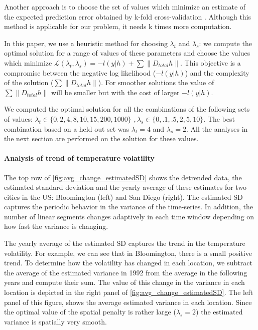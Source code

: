 \documentclass{article}
\begin{document}
Another approach is to choose the set of values which minimize an
estimate of the expected prediction error obtained by k-fold
cross-validation \citep{tibshirani_regression_1996} . Although this
method is applicable for our problem, it needs k times more
computation. 

In this paper, we use a heuristic method for choosing $\lambda_t$ and
$\lambda_s$: we compute the optimal solution for a range of values of
these parameters and choose the values which minimize
$\mathscr{L}(\lambda_t,\lambda_s)=-l(y|h)+ \sum \lVert D_{total}h
\lVert$. This objective is a compromise between the negative log
likelihood ($-l(y|h)$) and the complexity of the solution ($\sum
\lVert D_{total}h \lVert$). For smoother solutions the value of $\sum
\lVert D_{total}h \lVert$ will be smaller but with the cost of larger
$-l(y|h)$. 

We computed the optimal solution for all the combinations of the
following sets of values: $\lambda_t \in \{0,2,4,8,10,15,200,1000\} \, \, ,
\lambda_s \in \{0,.1,.5,2,5,10\}$. The best combination based on a held
out set was $\lambda_t=4$ and $\lambda_s=2$. All the analyses in the
next section are performed on the solution for these values. 


\paragraph{Analysis of trend of temperature volatility}

The top row of \autoref{fig:avg_change_estimatedSD} shows the
detrended data, the estimated standard deviation and the yearly
average of these estimates for two cities in the US: Bloomington (left) and San Diego (right). The estimated SD captures the periodic behavior in the variance of the time-series. In addition, the number of linear segments changes adaptively in each time window depending on how fast the variance is changing.  

The yearly average of the estimated SD captures the trend in the
temperature volatility. For example, we can see that in Bloomington,
there is a small positive trend. To determine how the volatility has
changed in each location, we subtract the average of the estimated
variance in 1992 from the average in the following years and compute
their sum. The value of this change in the variance in each location
is depicted in the right panel of \autoref{fig:avg_change_estimatedSD}. The left panel of this figure, shows the average estimated variance in each location. Since the optimal value of the spatial penalty is rather large ($\lambda_s=2$) the estimated variance is spatially very smooth.
\end{document}
